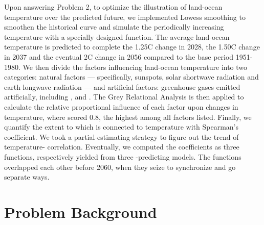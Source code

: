\documentclass[12pt]{article}
\begin{document}
Upon answering Problem 2, to optimize the illustration of land-ocean temperature over the predicted future, we implemented Lowess smoothing to smoothen the historical curve and simulate the periodically increasing temperature with a specially designed function. The average land-ocean temperature is predicted to complete the 1.25C change in 2028, the 1.50C change in 2037 and the eventual 2C change in 2056 compared to the base period 1951-1980. We then divide the factors influencing land-ocean temperature into two categories: natural factors --- specifically, sunspots, solar shortwave radiation and earth longwave radiation --- and artificial factors: greenhouse gases emitted artificially, including ,  and . The Grey Relational Analysis is then applied to calculate the relative proportional influence of each factor upon changes in temperature, where  scored 0.8, the highest among all factors listed. Finally, we quantify the extent to which  is connected to temperature with Spearman's coefficient. We took a partial-estimating strategy to figure out the trend of temperature- correlation. Eventually, we computed the coefficients as three functions, respectively yielded from three -predicting models. The functions overlapped each other before 2060, when they seize to synchronize and go separate ways.

\newpage

\begin{figure}[ht]
    \begin{center}
    
    \end{center}
\end{figure}


\newpage
\thispagestyle{empty}

\begin{spacing}{0.1}
    \tableofcontents
\end{spacing}

\newpage

\section{Problem Background}
\end{document}
